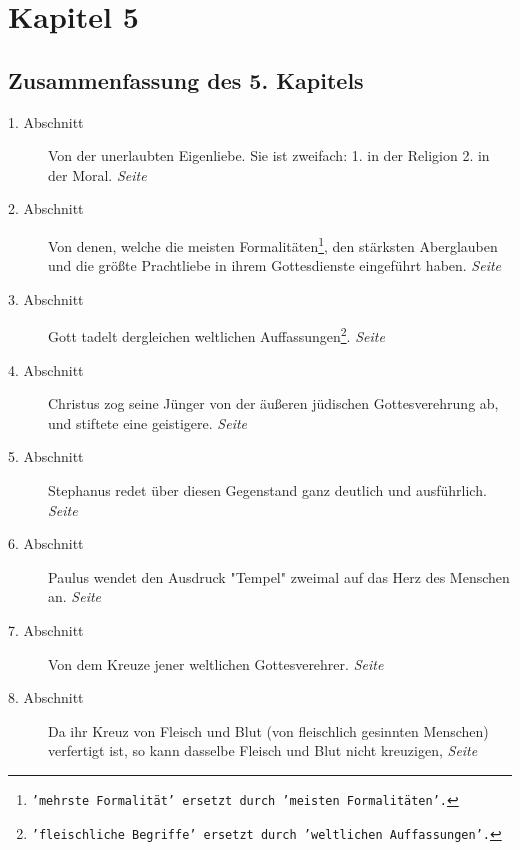 

\chapter{Kapitel 5} \label{kap5}

\section{Zusammenfassung des 5. Kapitels}

\begin{description}
\item[1. Abschnitt] Von der unerlaubten Eigenliebe. Sie ist zweifach: 1. in der
Religion 2. in der Moral.
\dotfill \textit{Seite~\pageref{kap5_ab1}}\\
\item[2. Abschnitt] Von denen, welche die meisten
Formalitäten\footnote{\texttt{'mehrste Formalität' ersetzt durch 'meisten
Formalitäten'.}}, den
stärksten
Aberglauben und die größte Prachtliebe in ihrem Gottesdienste eingeführt haben.
\dotfill \textit{Seite~\pageref{kap5_ab2}}\\
\item[3. Abschnitt] Gott tadelt dergleichen weltlichen
Auffassungen\footnote{\texttt{'fleischliche Begriffe' ersetzt durch 'weltlichen
Auffassungen'.}}.
\dotfill \textit{Seite~\pageref{kap5_ab3}}\\
\item[4. Abschnitt] Christus zog seine Jünger von der äußeren jüdischen
Gottesverehrung ab, und stiftete eine geistigere.
\dotfill \textit{Seite~\pageref{kap5_ab4}}\\
\item[5. Abschnitt] Stephanus redet über diesen Gegenstand ganz deutlich und
ausführlich.
\dotfill \textit{Seite~\pageref{kap5_ab5}}\\
\item[6. Abschnitt] Paulus wendet den Ausdruck "Tempel" zweimal auf das Herz des
Menschen an.
\dotfill \textit{Seite~\pageref{kap5_ab6}}\\
\item[7. Abschnitt] Von dem Kreuze jener weltlichen Gottesverehrer.
\dotfill \textit{Seite~\pageref{kap5_ab7}}\\
\item[8. Abschnitt] Da ihr Kreuz von Fleisch und Blut (von fleischlich gesinnten
Menschen) verfertigt ist, so kann dasselbe Fleisch und Blut nicht kreuzigen,
\dotfill \textit{Seite~\pageref{kap5_ab8}}\\

\end{description}
